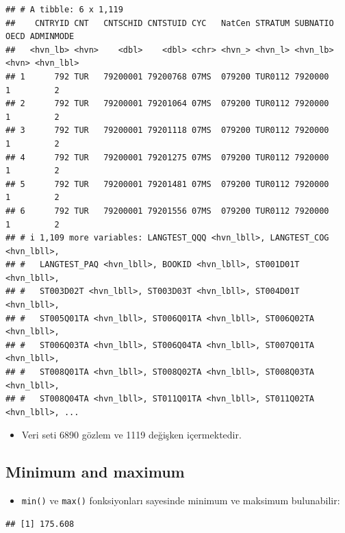 \documentclass[
  oneside]{book}
\newenvironment{Shaded}{\begin{snugshade}}{\end{snugshade}}
\newcommand{\FunctionTok}[1]{\textcolor[rgb]{0.13,0.29,0.53}{\textbf{#1}}}
\newcommand{\NormalTok}[1]{#1}
\newcommand{\SpecialCharTok}[1]{\textcolor[rgb]{0.81,0.36,0.00}{\textbf{#1}}}
\providecommand{\tightlist}{%
  \setlength{\itemsep}{0pt}\setlength{\parskip}{0pt}}
\begin{document}
\begin{verbatim}
## # A tibble: 6 x 1,119
##    CNTRYID CNT   CNTSCHID CNTSTUID CYC   NatCen STRATUM SUBNATIO  OECD ADMINMODE
##   <hvn_lb> <hvn>    <dbl>    <dbl> <chr> <hvn_> <hvn_l> <hvn_lb> <hvn> <hvn_lbl>
## 1      792 TUR   79200001 79200768 07MS  079200 TUR0112 7920000      1         2
## 2      792 TUR   79200001 79201064 07MS  079200 TUR0112 7920000      1         2
## 3      792 TUR   79200001 79201118 07MS  079200 TUR0112 7920000      1         2
## 4      792 TUR   79200001 79201275 07MS  079200 TUR0112 7920000      1         2
## 5      792 TUR   79200001 79201481 07MS  079200 TUR0112 7920000      1         2
## 6      792 TUR   79200001 79201556 07MS  079200 TUR0112 7920000      1         2
## # i 1,109 more variables: LANGTEST_QQQ <hvn_lbll>, LANGTEST_COG <hvn_lbll>,
## #   LANGTEST_PAQ <hvn_lbll>, BOOKID <hvn_lbll>, ST001D01T <hvn_lbll>,
## #   ST003D02T <hvn_lbll>, ST003D03T <hvn_lbll>, ST004D01T <hvn_lbll>,
## #   ST005Q01TA <hvn_lbll>, ST006Q01TA <hvn_lbll>, ST006Q02TA <hvn_lbll>,
## #   ST006Q03TA <hvn_lbll>, ST006Q04TA <hvn_lbll>, ST007Q01TA <hvn_lbll>,
## #   ST008Q01TA <hvn_lbll>, ST008Q02TA <hvn_lbll>, ST008Q03TA <hvn_lbll>,
## #   ST008Q04TA <hvn_lbll>, ST011Q01TA <hvn_lbll>, ST011Q02TA <hvn_lbll>, ...
\end{verbatim}

\begin{itemize}
\tightlist
\item
  Veri seti 6890 gözlem ve 1119 değişken içermektedir.
\end{itemize}

\hypertarget{minimum-and-maximum}{%
\subsection{Minimum and maximum}\label{minimum-and-maximum}}

\begin{itemize}
\tightlist
\item
  \texttt{min()} ve \texttt{max()} fonksiyonları sayesinde minimum ve maksimum bulunabilir:
\end{itemize}

\begin{Shaded}
\end{Shaded}

\begin{verbatim}
## [1] 175.608
\end{verbatim}
\end{document}
